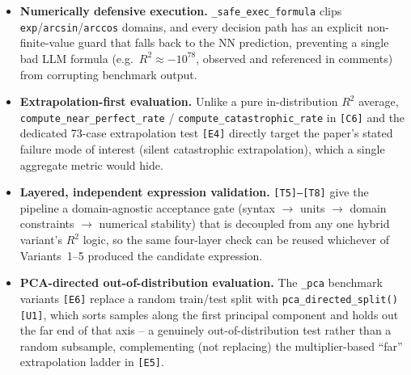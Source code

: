 \documentclass[11pt,a4paper]{article}
\newcommand{\code}[1]{\texttt{\small #1}}
\begin{document}
\begin{itemize}
  \item \textbf{Numerically defensive execution.} \code{\_safe\_exec\_formula}
        clips \code{exp}/\code{arcsin}/\code{arccos} domains, and every
        decision path has an explicit non-finite-value guard that falls
        back to the NN prediction, preventing a single bad LLM formula
        (e.g.\ $R^2\approx -10^{78}$, observed and referenced in comments)
        from corrupting benchmark output.
  \item \textbf{Extrapolation-first evaluation.} Unlike a pure
        in-distribution $R^2$ average, \code{compute\_near\_perfect\_rate}
        / \code{compute\_catastrophic\_rate} in \code{[C6]} and the
        dedicated 73-case extrapolation test \code{[E4]} directly target
        the paper's stated failure mode of interest (silent catastrophic
        extrapolation), which a single aggregate metric would hide.
  \item \textbf{Layered, independent expression validation.} \code{[T5]--[T8]}
        give the pipeline a domain-agnostic acceptance gate (syntax $\to$
        units $\to$ domain constraints $\to$ numerical stability) that is
        decoupled from any one hybrid variant's $R^2$ logic, so the same
        four-layer check can be reused whichever of Variants~1--5 produced
        the candidate expression.
  \item \textbf{PCA-directed out-of-distribution evaluation.} The
        \code{\_pca} benchmark variants \code{[E6]} replace a random
        train/test split with \code{pca\_directed\_split()} \code{[U1]},
        which sorts samples along the first principal component and holds
        out the far end of that axis -- a genuinely out-of-distribution
        test rather than a random subsample, complementing (not
        replacing) the multiplier-based ``far'' extrapolation ladder in
        \code{[E5]}.
\end{itemize}
\end{document}
